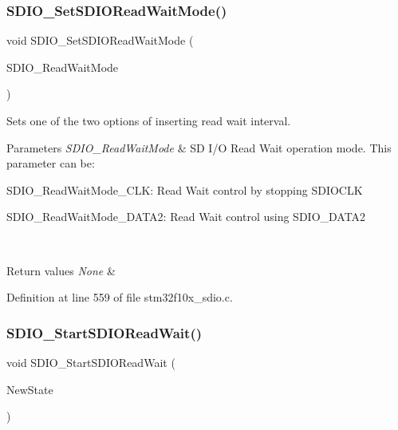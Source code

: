 \subsubsection{\texorpdfstring{S\+D\+I\+O\+\_\+\+Set\+S\+D\+I\+O\+Read\+Wait\+Mode()}{SDIO\_SetSDIOReadWaitMode()}}
{\footnotesize\ttfamily void S\+D\+I\+O\+\_\+\+Set\+S\+D\+I\+O\+Read\+Wait\+Mode (\begin{DoxyParamCaption}\item[{uint32\+\_\+t}]{S\+D\+I\+O\+\_\+\+Read\+Wait\+Mode }\end{DoxyParamCaption})}



Sets one of the two options of inserting read wait interval. 


\begin{DoxyParams}{Parameters}
{\em S\+D\+I\+O\+\_\+\+Read\+Wait\+Mode} & SD I/O Read Wait operation mode. This parameter can be\+: \begin{DoxyItemize}
\item S\+D\+I\+O\+\_\+\+Read\+Wait\+Mode\+\_\+\+C\+LK\+: Read Wait control by stopping S\+D\+I\+O\+C\+LK \item S\+D\+I\+O\+\_\+\+Read\+Wait\+Mode\+\_\+\+D\+A\+T\+A2\+: Read Wait control using S\+D\+I\+O\+\_\+\+D\+A\+T\+A2 \end{DoxyItemize}
\\
\hline
\end{DoxyParams}

\begin{DoxyRetVals}{Return values}
{\em None} & \\
\hline
\end{DoxyRetVals}


Definition at line 559 of file stm32f10x\+\_\+sdio.\+c.

\mbox{\label{group___s_d_i_o___exported___functions_gac88f914d9a68a83abc2265ec8a7b79fc}} 
\subsubsection{\texorpdfstring{S\+D\+I\+O\+\_\+\+Start\+S\+D\+I\+O\+Read\+Wait()}{SDIO\_StartSDIOReadWait()}}
{\footnotesize\ttfamily void S\+D\+I\+O\+\_\+\+Start\+S\+D\+I\+O\+Read\+Wait (\begin{DoxyParamCaption}\item[{\hyperlink{group___exported__types_gac9a7e9a35d2513ec15c3b537aaa4fba1}{Functional\+State}}]{New\+State }\end{DoxyParamCaption})}



